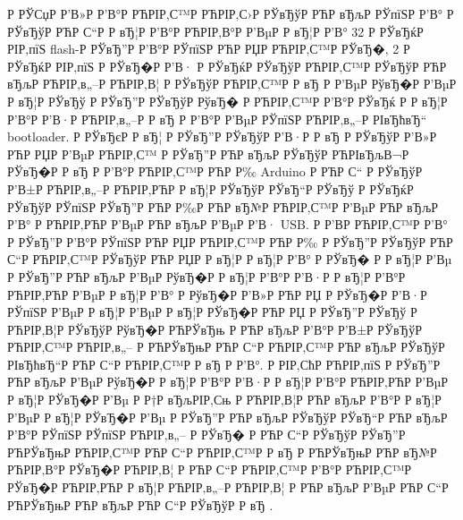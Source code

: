 \documentclass[a4paper,14pt]{extarticle}
\begin{document}
Р  РЎСџР  Р’В»Р  Р’В°Р РЋРІР‚С™Р РЋРІР‚С›Р  РЎвЂўР РЋР вЂљР  РЎпїЅР  Р’В° Р  РЎвЂўР РЋР С“Р  Р вЂ¦Р  Р’В°Р РЋРІР‚В°Р  Р’ВµР  Р вЂ¦Р  Р’В° 32 Р  РЎвЂќР  РІР‚пїЅ flash-Р  РЎвЂ”Р  Р’В°Р  РЎпїЅР РЋР РЏР РЋРІР‚С™Р  РЎвЂ�, 2 Р  РЎвЂќР  РІР‚пїЅ Р  РЎвЂ�Р  Р’В· Р  РЎвЂќР  РЎвЂўР РЋРІР‚С™Р  РЎвЂўР РЋР вЂљР РЋРІР‚в„–Р РЋРІР‚В¦ Р  РЎвЂўР РЋРІР‚С™Р  Р вЂ Р  Р’ВµР  РўвЂ�Р  Р’ВµР  Р вЂ¦Р  РЎвЂў Р  РЎвЂ”Р  РЎвЂўР  РўвЂ� Р РЋРІР‚С™Р  Р’В°Р  РЎвЂќ Р  Р вЂ¦Р  Р’В°Р  Р’В·Р РЋРІР‚в„–Р  Р вЂ Р  Р’В°Р  Р’ВµР  РЎпїЅР РЋРІР‚в„–Р  РІвЂћвЂ“ bootloader. Р  РЎвЂєР  Р вЂ¦ Р  РЎвЂ”Р  РЎвЂўР  Р’В·Р  Р вЂ Р  РЎвЂўР  Р’В»Р РЋР РЏР  Р’ВµР РЋРІР‚С™ Р  РЎвЂ”Р РЋР вЂљР  РЎвЂўР РЋРІвЂљВ¬Р  РЎвЂ�Р  Р вЂ Р  Р’В°Р РЋРІР‚С™Р РЋР Р‰ Arduino Р РЋР С“ Р  РЎвЂўР  Р’В±Р РЋРІР‚в„–Р РЋРІР‚РЋР  Р вЂ¦Р  РЎвЂўР  РЎвЂ“Р  РЎвЂў Р  РЎвЂќР  РЎвЂўР  РЎпїЅР  РЎвЂ”Р РЋР Р‰Р РЋР вЂ№Р РЋРІР‚С™Р  Р’ВµР РЋР вЂљР  Р’В° Р РЋРІР‚РЋР  Р’ВµР РЋР вЂљР  Р’ВµР  Р’В· USB. Р  Р’В­Р РЋРІР‚С™Р  Р’В° Р  РЎвЂ”Р  Р’В°Р  РЎпїЅР РЋР РЏР РЋРІР‚С™Р РЋР Р‰ Р  РЎвЂ”Р  РЎвЂўР РЋР С“Р РЋРІР‚С™Р  РЎвЂўР РЋР РЏР  Р вЂ¦Р  Р вЂ¦Р  Р’В° Р  РЎвЂ� Р  Р вЂ¦Р  Р’Вµ Р  РЎвЂ”Р РЋР вЂљР  Р’ВµР  РўвЂ�Р  Р вЂ¦Р  Р’В°Р  Р’В·Р  Р вЂ¦Р  Р’В°Р РЋРІР‚РЋР  Р’ВµР  Р вЂ¦Р  Р’В° Р  РўвЂ�Р  Р’В»Р РЋР РЏ Р  РЎвЂ�Р  Р’В·Р  РЎпїЅР  Р’ВµР  Р вЂ¦Р  Р’ВµР  Р вЂ¦Р  РЎвЂ�Р РЋР РЏ Р  РЎвЂ”Р  РЎвЂў Р РЋРІР‚В¦Р  РЎвЂўР  РўвЂ�Р РЋРЎвЂњ Р РЋР вЂљР  Р’В°Р  Р’В±Р  РЎвЂўР РЋРІР‚С™Р РЋРІР‚в„– Р РЋРЎвЂњР РЋР С“Р РЋРІР‚С™Р РЋР вЂљР  РЎвЂўР  РІвЂћвЂ“Р РЋР С“Р РЋРІР‚С™Р  Р вЂ Р  Р’В°. Р  РІР‚СћР РЋРІР‚пїЅ Р  РЎвЂ”Р РЋР вЂљР  Р’ВµР  РўвЂ�Р  Р вЂ¦Р  Р’В°Р  Р’В·Р  Р вЂ¦Р  Р’В°Р РЋРІР‚РЋР  Р’ВµР  Р вЂ¦Р  РЎвЂ�Р  Р’Вµ Р Р†Р вЂљРІР‚Сњ Р РЋРІР‚В¦Р РЋР вЂљР  Р’В°Р  Р вЂ¦Р  Р’ВµР  Р вЂ¦Р  РЎвЂ�Р  Р’Вµ Р  РЎвЂ”Р РЋР вЂљР  РЎвЂўР  РЎвЂ“Р РЋР вЂљР  Р’В°Р  РЎпїЅР  РЎпїЅР РЋРІР‚в„– Р  РЎвЂ� Р РЋР С“Р  РЎвЂўР  РЎвЂ”Р РЋРЎвЂњР РЋРІР‚С™Р РЋР С“Р РЋРІР‚С™Р  Р вЂ Р РЋРЎвЂњР РЋР вЂ№Р РЋРІР‚В°Р  РЎвЂ�Р РЋРІР‚В¦ Р РЋР С“Р РЋРІР‚С™Р  Р’В°Р РЋРІР‚С™Р  РЎвЂ�Р РЋРІР‚РЋР  Р вЂ¦Р РЋРІР‚в„–Р РЋРІР‚В¦ Р РЋР вЂљР  Р’ВµР РЋР С“Р РЋРЎвЂњР РЋР вЂљР РЋР С“Р  РЎвЂўР  Р вЂ .
\end{document}
